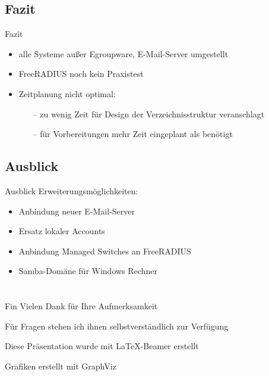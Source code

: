 \documentclass[presentation,svgnames,12pt]{beamer}
\begin{document}
\subsection{Fazit}
\begin{frame}{Fazit}
\begin{itemize}
	\item alle Systeme außer Egroupware, E-Mail-Server umgestellt
	\item FreeRADIUS noch kein Praxistest
	\item Zeitplanung nicht optimal:
	\vspace{6pt}
	\begin{itemize}
		\item[--] zu wenig Zeit für Design der Verzeichnisstruktur veranschlagt
		\item[--] für Vorbereitungen mehr Zeit eingeplant als benötigt
	\end{itemize}
\end{itemize}
\end{frame}


\subsection{Ausblick}
\begin{frame}{Ausblick}
Erweiterungsmöglichkeiten:
\vspace{6pt}
	\begin{itemize}
		\item Anbindung neuer E-Mail-Server
		\item Ersatz lokaler Accounts
		\item Anbindung Managed Switches an FreeRADIUS
		\item Samba-Domäne für Windows Rechner
	\end{itemize}
\end{frame}


\section{} %
\begin{frame}{Fin}
	\bigskip\bigskip\bigskip\bigskip\bigskip\bigskip
	Vielen Dank für Ihre Aufmerksamkeit
	
	Für Fragen stehen ich ihnen selbstverständlich zur Verfügung
	
	\bigskip\bigskip\bigskip
	\bigskip
	\bigskip
	\bigskip Diese Präsentation wurde mit \LaTeX{}-Beamer erstellt
	
	Grafiken erstellt mit GraphViz
\end{frame}
\end{document}
